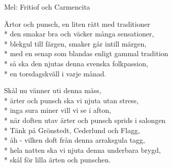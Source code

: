 \begin{SongText}
    \begin{SongInfo}
        Mel: Fritiof och Carmencita
    \end{SongInfo}
    \begin{SongVerse}
        Ärtor och punsch, en liten rätt med traditioner\\*%
        den smakar bra och väcker många sensationer,\\*%
        blekgul till färgen, smaker går intill märgen,\\*%
        med en senap som blandas enligt gammal tradition\\*%
        så ska den njutas denna svenska folkpassion,\\*%
        en torsdagskväll i varje månad.
    \end{SongVerse}
    \begin{SongVerse}
        Skål nu vänner uti denna mäss,\\*%
        ärter och punsch ska vi njuta utan stress,\\*%
        inga sura miner vill vi se i afton,\\*%
        när doften utav ärter och punsch sprids i salongen\\*%
        Tänk på Grönstedt, Cederlund och Flagg,\\*%
        åh - vilken doft från denna arraksgula tagg,\\*%
        hela natten ska vi njuta denna underbara brygd,\\*%
        skål för lilla ärten och punschen.
    \end{SongVerse}
\end{SongText}
